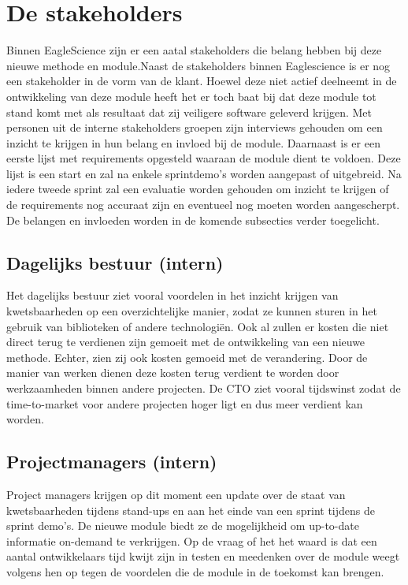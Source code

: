 \section{De stakeholders}\label{sec:de-stakeholders}
Binnen EagleScience zijn er een aatal stakeholders die belang hebben bij deze nieuwe methode en module.Naast de stakeholders binnen Eaglescience is er nog een stakeholder in de vorm van de klant. Hoewel deze niet actief deelneemt in de ontwikkeling van deze module heeft het er toch baat bij dat deze module tot stand komt met als resultaat dat zij veiligere software geleverd krijgen. Met personen uit de interne stakeholders groepen zijn interviews gehouden om een inzicht te krijgen in hun belang en invloed bij de module.
Daarnaast is er een eerste lijst met requirements opgesteld waaraan de module dient te voldoen.
Deze lijst is een start en zal na enkele sprintdemo's worden aangepast of uitgebreid.
Na iedere tweede sprint zal een evaluatie worden gehouden om inzicht te krijgen of de requirements nog accuraat zijn en eventueel nog moeten worden aangescherpt.
De belangen en invloeden worden in de komende subsecties verder toegelicht.

\subsection{Dagelijks bestuur (intern)}\label{subsec:dagelijks-bestuur-(intern)}
Het dagelijks bestuur ziet vooral voordelen in het inzicht krijgen van kwetsbaarheden op een overzichtelijke manier, zodat ze kunnen sturen in het gebruik van biblioteken of andere technologiën. Ook al zullen er kosten die niet direct terug te verdienen zijn gemoeit met de ontwikkeling van een nieuwe methode.
Echter, zien zij ook kosten gemoeid met de verandering.
Door de manier van werken dienen deze kosten terug verdient te worden door werkzaamheden binnen andere projecten.
De CTO ziet vooral tijdswinst zodat de time-to-market voor andere projecten hoger ligt en dus meer verdient kan worden.
\subsection{Projectmanagers (intern)}\label{subsec:projectmanagers-(intern)}
Project managers krijgen op dit moment een update over de staat van kwetsbaarheden tijdens stand-ups en aan het einde van een sprint tijdens de sprint demo's.
De nieuwe module biedt ze de mogelijkheid om up-to-date informatie on-demand te verkrijgen.
Op de vraag of het het waard is dat een aantal ontwikkelaars tijd kwijt zijn in testen en meedenken over de module weegt volgens hen op tegen de voordelen die de module in de toekomst kan brengen.
